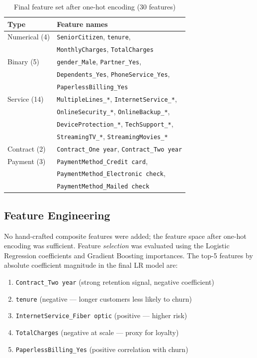 \documentclass[conference]{IEEEtran}
\begin{document}
\begin{table}[H]
\centering
\caption{Final feature set after one-hot encoding (30 features)}
\label{tab:features}
\renewcommand{\arraystretch}{1.1}
\begin{tabular}{ll}
\toprule
\textbf{Type} & \textbf{Feature names} \\
\midrule
Numerical (4) & \texttt{SeniorCitizen}, \texttt{tenure}, \\
              & \texttt{MonthlyCharges}, \texttt{TotalCharges} \\
\midrule
Binary (5)    & \texttt{gender\_Male}, \texttt{Partner\_Yes}, \\
              & \texttt{Dependents\_Yes}, \texttt{PhoneService\_Yes}, \\
              & \texttt{PaperlessBilling\_Yes} \\
\midrule
Service (14)  & \texttt{MultipleLines\_*}, \texttt{InternetService\_*}, \\
              & \texttt{OnlineSecurity\_*}, \texttt{OnlineBackup\_*}, \\
              & \texttt{DeviceProtection\_*}, \texttt{TechSupport\_*}, \\
              & \texttt{StreamingTV\_*}, \texttt{StreamingMovies\_*} \\
\midrule
Contract (2)  & \texttt{Contract\_One year}, \texttt{Contract\_Two year} \\
\midrule
Payment (3)   & \texttt{PaymentMethod\_Credit card}, \\
              & \texttt{PaymentMethod\_Electronic check}, \\
              & \texttt{PaymentMethod\_Mailed check} \\
\bottomrule
\end{tabular}
\end{table}

\subsection{Feature Engineering}

No hand-crafted composite features were added; the feature space after
one-hot encoding was sufficient. Feature \textit{selection} was evaluated
using the Logistic Regression coefficients and Gradient Boosting
importances. The top-5 features by absolute coefficient magnitude in
the final LR model are:

\begin{enumerate}
  \item \texttt{Contract\_Two year} (strong retention signal, negative
        coefficient)
  \item \texttt{tenure} (negative — longer customers less likely to churn)
  \item \texttt{InternetService\_Fiber optic} (positive — higher risk)
  \item \texttt{TotalCharges} (negative at scale — proxy for loyalty)
  \item \texttt{PaperlessBilling\_Yes} (positive correlation with churn)
\end{enumerate}
\end{document}
